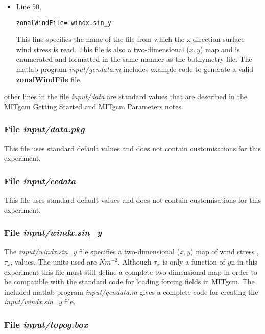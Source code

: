 {\begin{itemize}
\item Line 50,
\begin{verbatim}
zonalWindFile='windx.sin_y'
\end{verbatim}
This line specifies the name of the file from which the x-direction
surface wind stress is read. This file is also a two-dimensional
($x,y$) map and is enumerated and formatted in the same manner as the 
bathymetry file. The matlab program {\it input/gendata.m} includes example 
code to generate a valid 
{\bf zonalWindFile} 
file.  

\end{itemize}

\noindent other lines in the file {\it input/data} are standard values
that are described in the MITgcm Getting Started and MITgcm Parameters
notes.

\begin{small}

\end{small}

\subsubsection{File {\it input/data.pkg}}

This file uses standard default values and does not contain
customisations for this experiment.

\subsubsection{File {\it input/eedata}}

This file uses standard default values and does not contain
customisations for this experiment.

\subsubsection{File {\it input/windx.sin\_y}}

The {\it input/windx.sin\_y} file specifies a two-dimensional ($x,y$) 
map of wind stress ,$\tau_{x}$, values. The units used are $Nm^{-2}$.
Although $\tau_{x}$ is only a function of $y$n in this experiment
this file must still define a complete two-dimensional map in order
to be compatible with the standard code for loading forcing fields 
in MITgcm. The included matlab program {\it input/gendata.m} gives a complete
code for creating the {\it input/windx.sin\_y} file.

\subsubsection{File {\it input/topog.box}}


}
